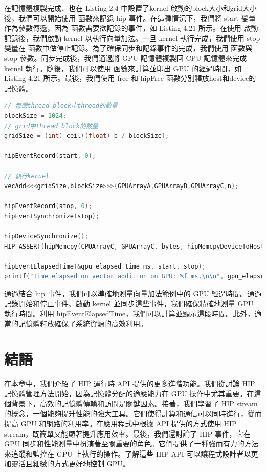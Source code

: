 在記憶體複製完成、也在 Listing 2.4 中設置了kernel 啟動的block大小和grid大小後，我們可以開始使用  函數來記錄 hip 事件。在這種情況下，我們將 start 變量作為參數傳遞，因為  函數需要欲記錄的事件，如 Listing 4.21 所示。在使用  啟動記錄後，我們啟動 kernel 以執行向量加法。一旦 kernel 執行完成，我們使用 stop 變量在  函數中做停止記錄。為了確保同步和記錄事件的完成，我們使用  函數與 stop 參數。同步完成後，我們通過將 GPU 記憶體複製回 CPU 記憶體來完成 kernel 執行。隨後，我們可以使用  函數來計算並印出 GPU 的經過時間，如 Listing 4.21 所示。最後，我們使用 free 和 hipFree 函數分別釋放host和device的記憶體。

\begin{lstlisting}[language=C, caption={組織thread與啟動kernel}, label={21st:example}]
// 每個thread block中thread的數量
blockSize = 1024;
// grid中thread block的數量
gridSize = (int) ceil((float) b / blockSize);

hipEventRecord(start, 0);

// 執行kernel
vecAdd<<<gridSize,blockSize>>>(GPUArrayA,GPUArrayB,GPUArrayC,n);

hipEventRecord(stop, 0);
hipEventSynchronize(stop);

hipDeviceSynchronize();
HIP_ASSERT(hipMemcpy(CPUArrayC, GPUArrayC, bytes, hipMemcpyDeviceToHost));

hipEventElapsedTime(&gpu_elapsed_time_ms, start, stop);
printf("Time elapsed on vector addition on GPU: %f ms.\n\n", gpu_elapsed_time_ms);
\end{lstlisting}

通過結合 hip 事件，我們可以準確地測量向量加法範例中的 GPU 經過時間。通過記錄開始和停止事件、啟動 kernel 並同步這些事件，我們確保精確地測量 GPU 執行時間。利用 hipEventElapsedTime，我們可以計算並顯示這段時間。此外，適當的記憶體釋放確保了系統資源的高效利用。

\section{結語}
在本章中，我們介紹了 HIP 運行時 API 提供的更多進階功能。我們從討論 HIP 記憶體管理方法開始，因為記憶體分配的適應能力在 GPU 操作中尤其重要。在這個背景下，高效的記憶體傳輸和訪問是關鍵因素。接著，我們學習了 HIP stream的概念，一個能夠提升性能的強大工具。它們使得計算和通信可以同時進行，從而提高 GPU 和網路的利用率。在應用程式中根據 API 提供的方式使用 HIP stream，既簡單又能顯著提升應用效率。最後，我們還討論了 HIP 事件，它在 GPU 同步和性能測量中扮演著至關重要的角色。它們提供了一種強而有力的方法來追蹤和監控在 GPU 上執行的操作。了解這些 HIP API 可以讓程式設計者以更加靈活且細緻的方式更好地控制 GPU。

